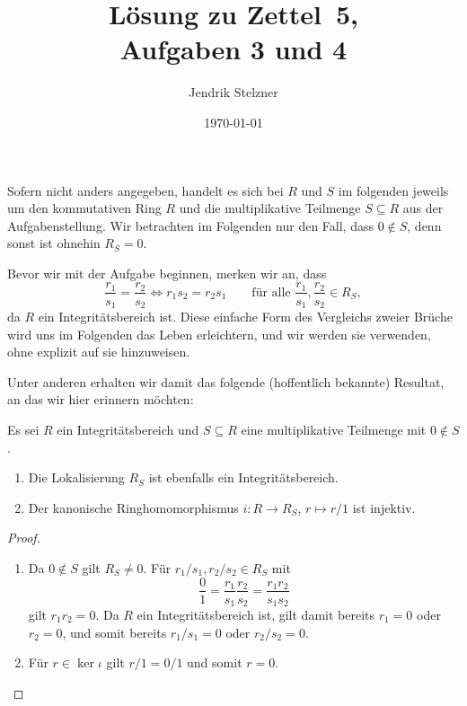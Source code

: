 \documentclass[a4paper,10pt,numbers=noenddot]{scrartcl}
\title{Lösung zu Zettel~5, \\ Aufgaben 3 und 4}
\author{Jendrik Stelzner}
\date{\today}
\begin{document}
\maketitle

\addtocounter{section}{2}










\section{}

Sofern nicht anders angegeben, handelt es sich bei $R$ und $S$ im folgenden jeweils um den kommutativen Ring $R$ und die multiplikative Teilmenge $S \subseteq R$ aus der Aufgabenstellung.
Wir betrachten im Folgenden nur den Fall, dass $0 \notin S$, denn sonst ist ohnehin $R_S = 0$.

Bevor wir mit der Aufgabe beginnen, merken wir an, dass
\[
        \frac{r_1}{s_1} = \frac{r_2}{s_2}
  \iff  r_1 s_2 = r_2 s_1
  \qquad
  \text{für alle $\frac{r_1}{s_1}, \frac{r_2}{s_2} \in R_S$},
\]
da $R$ ein Integritätsbereich ist.
Diese einfache Form des Vergleichs zweier Brüche wird uns im Folgenden das Leben erleichtern, und wir werden sie verwenden, ohne explizit auf sie hinzuweisen.

Unter anderen erhalten wir damit das folgende (hoffentlich bekannte) Resultat, an das wir hier erinnern möchten:
\begin{lemma}
  \label{lemma: localization of integral domains}
  Es sei $R$ ein Integritätsbereich und $S \subseteq R$ eine multiplikative Teilmenge mit $0 \notin S$.
  \begin{enumerate}
    \item
      Die Lokalisierung $R_S$ ist ebenfalls ein Integritätsbereich.
    \item
      Der kanonische Ringhomomorphismus $i \colon R \to R_S$, $r \mapsto r/1$ ist injektiv.
  \end{enumerate}
\end{lemma}
\begin{proof}
  \begin{enumerate}
    \item
      Da $0 \notin S$ gilt $R_S \neq 0$.
      Für $r_1/s_1, r_2/s_2 \in R_S$ mit
      \[
          \frac{0}{1}
        = \frac{r_1}{s_1} \frac{r_2}{s_2}
        = \frac{r_1 r_2}{s_1 s_2}
      \]
      gilt $r_1 r_2 = 0$.
      Da $R$ ein Integritätsbereich ist, gilt damit bereits $r_1 = 0$ oder $r_2 = 0$, und somit bereits $r_1/s_1 = 0$ oder $r_2/s_2 = 0$.
    \item
      Für $r \in \ker \iota$ gilt $r/1 = 0/1$ und somit $r = 0$.
  \end{enumerate}
\end{proof}
\end{document}
